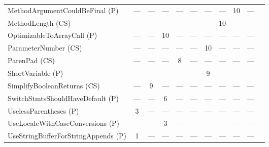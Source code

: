 \begin{table*}[t]
{\begin{tabular}{lcccccccccc}
				\rowcolor{grey}
				MethodArgumentCouldBeFinal (P) &---&---&---&---&---&---&---&10&---\\
				MethodLength (CS) &---&---&---&---&---&---&10&---&---\\
				\rowcolor{grey}
				OptimizableToArrayCall (P) &---&---&10&---&---&---&---&---&---\\
				ParameterNumber (CS) &---&---&---&---&---&10&---&---&---\\
				\rowcolor{grey}
				ParenPad (CS) &---&---&---&8&---&---&---&---&---\\
				ShortVariable (P) &---&---&---&---&---&9&---&---&---\\
				\rowcolor{grey}
				SimplifyBooleanReturns (CS) &---&9&---&---&---&---&---&---&---\\
				SwitchStmtsShouldHaveDefault (P) &---&---&6&---&---&---&---&---&---\\
				\rowcolor{grey}
				UselessParentheses (P) &3&---&---&---&---&---&---&---&---\\
				UseLocaleWithCaseConversions (P) &---&---&3&---&---&---&---&---&---\\
				\rowcolor{grey}
				UseStringBufferForStringAppends (P) &1&---&---&---&---&---&---&---&---\\
				\hline
			\end{tabular}

	}
	\vspace{-2mm}
\end{table*}

